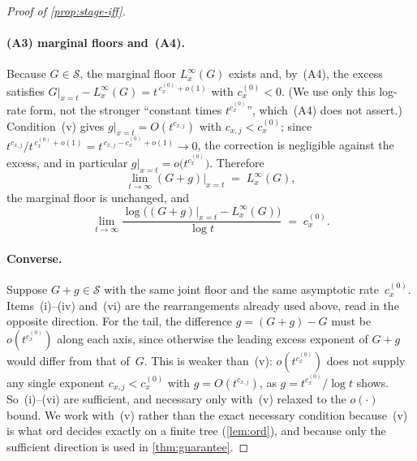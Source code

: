 \documentclass[11pt]{article}
\newcommand{\calS}{\mathcal{S}}
\theoremstyle{plain}
\theoremstyle{remark}
\begin{document}
\begin{proof}[Proof of \cref{prop:stage-iff}]
\paragraph{(A3) marginal floors and~(A4).}
Because $G\in\calS$, the marginal floor $L^{\infty}_{x}(G)$ exists and, by~(A4), the excess satisfies
$G|_{x=t}-L^{\infty}_{x}(G) = t^{\,c_x^{(0)}+o(1)}$ with $c_x^{(0)}<0$.
(We use only this log-rate form, not the stronger ``constant times $t^{c_x^{(0)}}$'', which~(A4) does not assert.)
Condition~(v) gives $g|_{x=t}=O(t^{c_{x,j}})$ with $c_{x,j}<c_x^{(0)}$; since $t^{c_{x,j}}/t^{\,c_x^{(0)}+o(1)} = t^{\,c_{x,j}-c_x^{(0)}+o(1)} \to 0$, the correction is negligible against the excess, and in particular $g|_{x=t}=o\bigl(t^{c_x^{(0)}}\bigr)$.
Therefore
\[
  \lim_{t\to\infty}(G+g)\big|_{x=t}
  \;=\;
  L^{\infty}_{x}(G),
\]
the marginal floor is unchanged, and
\[
  \lim_{t\to\infty}
  \frac{\log\bigl((G+g)|_{x=t}-L^{\infty}_{x}(G)\bigr)}{\log t}
  \;=\; c_x^{(0)}.
\]
\paragraph{Converse.}
Suppose $G+g\in\calS$ with the same joint floor and the same asymptotic rate~$c_x^{(0)}$.
Items~(i)--(iv) and~(vi) are the rearrangements already used above, read in the opposite direction.
For the tail, the difference $g=(G+g)-G$ must be $o(t^{c_x^{(0)}})$ along each axis, since otherwise the leading excess exponent of $G+g$ would differ from that of~$G$.
This is weaker than~(v): $o(t^{c_x^{(0)}})$ does not supply any single exponent $c_{x,j}<c_x^{(0)}$ with $g=O(t^{c_{x,j}})$, as $g=t^{c_x^{(0)}}/\log t$ shows.
So~(i)--(vi) are sufficient, and necessary only with~(v) relaxed to the $o(\cdot)$ bound.
We work with~(v) rather than the exact necessary condition because~(v) is what $\mathrm{ord}$ decides exactly on a finite tree (\cref{lem:ord}), and because only the sufficient direction is used in \cref{thm:guarantee}.
\end{proof}
\end{document}
